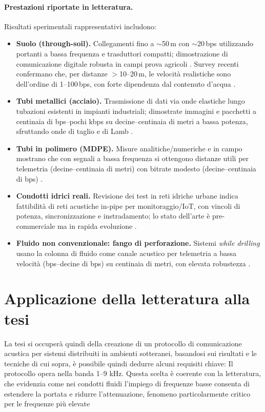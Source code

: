 \paragraph{Prestazioni riportate in letteratura.}
Risultati sperimentali rappresentativi includono:
\begin{itemize}
    \item \textbf{Suolo (through-soil).} Collegamenti fino a $\sim$50\,m con $\sim$20\,bps utilizzando portanti a bassa frequenza e trasduttori compatti; dimostrazione di comunicazione digitale robusta in campi prova agricoli \citep{yang2020soil}. Survey recenti confermano che, per distanze $>$10–20\,m, le velocità realistiche sono dell’ordine di 1–100\,bps, con forte dipendenza dal contenuto d’acqua \citep{raza2020wuc,acm2023wusn}.
    \item \textbf{Tubi metallici (acciaio).} Trasmissione di dati via onde elastiche lungo tubazioni esistenti in impianti industriali; dimostrate immagini e pacchetti a centinaia di bps–pochi kbps su decine–centinaia di metri a bassa potenza, sfruttando onde di taglio e di Lamb \citep{heifetz2017pipes,heifetz2020shear}.
    \item \textbf{Tubi in polimero (MDPE).} Misure analitiche/numeriche e in campo mostrano che con segnali a bassa frequenza si ottengono distanze utili per telemetria (decine–centinaia di metri) con bitrate modesto (decine–centinaia di bps) \citep{farai2023mdpe,farai2021phd}.
    \item \textbf{Condotti idrici reali.} Revisione dei test in reti idriche urbane indica fattibilità di reti acustiche in-pipe per monitoraggio/IoT, con vincoli di potenza, sincronizzazione e instradamento; lo stato dell’arte è pre-commerciale ma in rapida evoluzione \citep{fishta2023inpipe}.
    \item \textbf{Fluido non convenzionale: fango di perforazione.} Sistemi \emph{while drilling} usano la colonna di fluido come canale acustico per telemetria a bassa velocità (bps–decine di bps) su centinaia di metri, con elevata robustezza \citep{zheng2023mud}.
\end{itemize}

\section{Applicazione della letteratura alla tesi}
La tesi si occuperà quindi della creazione di un protocollo di comunicazione acustica per sistemi distribuiti in ambienti sotteranei, 
basandosi sui risultati e le tecniche di cui sopra, è possibile quindi dedurre alcuni requisiti chiave:
Il protocollo opera nella banda 1–9 kHz. Questa scelta è coerente con la letteratura, che evidenzia come nei condotti fluidi l’impiego di frequenze basse consenta di estendere la portata e ridurre l’attenuazione, fenomeno particolarmente critico per le frequenze più elevate \citep{fishta2023inpipe}
